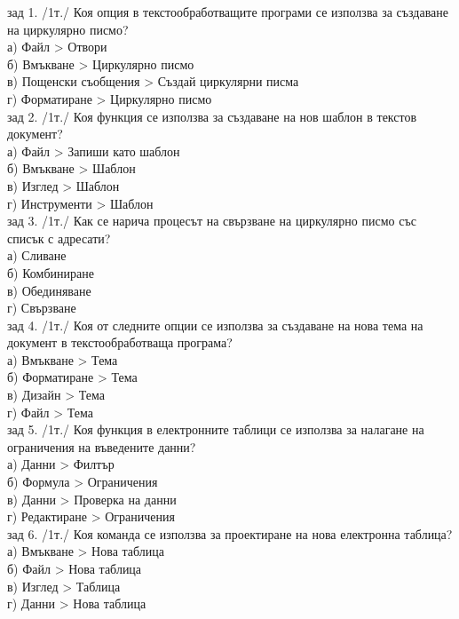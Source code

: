 % 
зад 1. /1т./ Коя опция в текстообработващите програми се използва за създаване на циркулярно писмо?\\
а) Файл > Отвори\\
б) Вмъкване > Циркулярно писмо\\
в) Пощенски съобщения > Създай циркулярни писма\\
г) Форматиране > Циркулярно писмо\\

% 
зад 2. /1т./ Коя функция се използва за създаване на нов шаблон в текстов документ?\\
а) Файл > Запиши като шаблон\\
б) Вмъкване > Шаблон\\
в) Изглед > Шаблон\\
г) Инструменти > Шаблон\\

% 
зад 3. /1т./ Как се нарича процесът на свързване на циркулярно писмо със списък с адресати?\\
а) Сливане\\
б) Комбиниране\\
в) Обединяване\\
г) Свързване\\

% 
% 
зад 4. /1т./ Коя от следните опции се използва за създаване на нова тема на документ в текстообработваща програма?\\
а) Вмъкване > Тема\\
б) Форматиране > Тема\\
в) Дизайн > Тема\\
г) Файл > Тема\\

% 
зад 5. /1т./ Коя функция в електронните таблици се използва за налагане на ограничения на въведените данни?\\
а) Данни > Филтър\\
б) Формула > Ограничения\\
в) Данни > Проверка на данни\\
г) Редактиране > Ограничения\\

% 
% 
зад 6. /1т./ Коя команда се използва за проектиране на нова електронна таблица?\\
а) Вмъкване > Нова таблица\\
б) Файл > Нова таблица\\
в) Изглед > Таблица\\
г) Данни > Нова таблица\\

